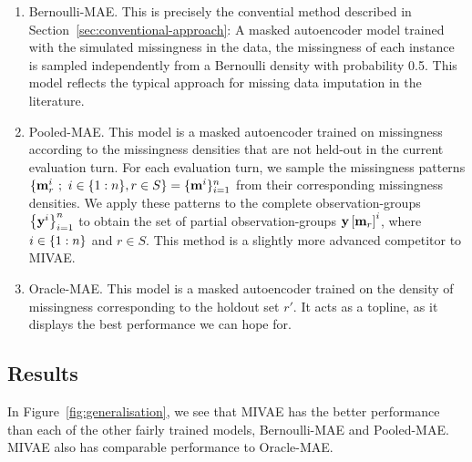 \documentclass[../thesis.tex]{subfiles}
\begin{document}
\begin{enumerate}
    \item Bernoulli-MAE. This is precisely the convential method described in Section~\ref{sec:conventional-approach}: A masked autoencoder model trained with the simulated missingness in the data, the missingness of each instance is sampled independently from a Bernoulli density with probability 0.5. This model reflects the typical approach for missing data imputation in the literature. 
    \item Pooled-MAE. This model is a masked autoencoder trained on missingness according to the missingness densities that are not held-out in the current evaluation turn. For each evaluation turn, we sample the missingness patterns $\{\mathbf{{m}}^{i}_r ~;~ i \in \{1:n\}, r \in S\} = \{\mathbf{{m}}^i\}_{i=1}^{n}$ from their corresponding missingness densities. We apply these patterns to the complete observation-groups $\left\{\mathbf{{y}}^i\right\}_{i=1}^{n}$ to obtain the set of partial observation-groups $\mathbf{{y}} \left[ \mathbf{{m}}_r \right]^i$, where $i \in \{1:n\}$ and $r \in S$. This method is a slightly more advanced competitor to MIVAE.
    \item Oracle-MAE. This model is a masked autoencoder trained on the density of missingness corresponding to the holdout set $r'$. It acts as a topline, as it displays the best performance we can hope for.
\end{enumerate}

\subsection{Results}

In Figure~\ref{fig:generalisation}, we see that MIVAE has the better performance than each of the other fairly trained models, Bernoulli-MAE and Pooled-MAE. MIVAE also has comparable performance to Oracle-MAE. 

\end{document}
